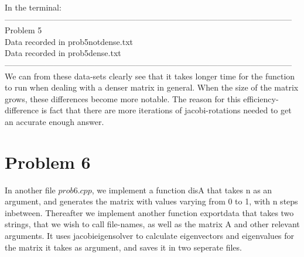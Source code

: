 \documentclass{article} %
\begin{document}
  In the terminal: \\
  ---------------------------------------------------------------------------------------------------------
  Problem 5 \\
  Data recorded in prob5notdense.txt \\
  Data recorded in prob5dense.txt \\
  --------------------------------------------------------------------------------------------------------- \\
  
  We can from these data-sets clearly see that it takes longer time for the function to run when dealing with a denser matrix in general. When the size of the 
  matrix grows, these differences become more notable. The reason for this efficiency-difference is fact that there are more 
  iterations of jacobi-rotations needed to get an accurate enough answer. 


  \section{Problem 6} 
  In another file $prob6.cpp$, we implement a function disA that takes n as an argument, and generates the matrix with values varying from 
  0 to 1, with n steps inbetween. Thereafter we implement another function exportdata that takes two strings, that we wish to call file-names, 
  as well as the matrix A and other relevant arguments. It uses jacobieigensolver to calculate eigenvectors and eigenvalues for 
  the matrix it takes as argument, and saves it in two seperate files. 
\end{document}
